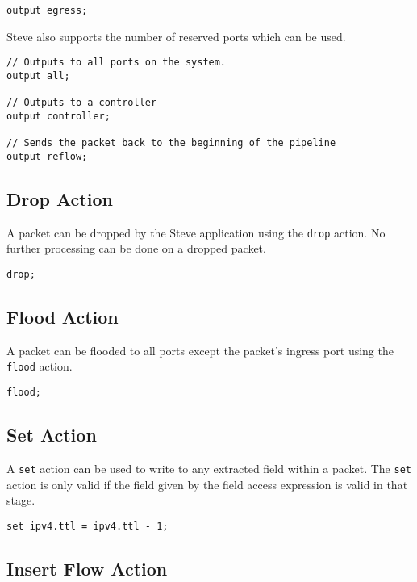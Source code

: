 \begin{lstlisting}
output egress;
\end{lstlisting}

Steve also supports the number of reserved ports which can be used.

\begin{lstlisting}
// Outputs to all ports on the system.
output all; 

// Outputs to a controller
output controller; 

// Sends the packet back to the beginning of the pipeline
output reflow; 
\end{lstlisting}

\subsection{Drop Action} \label{drop_action_tut}

A packet can be dropped by the Steve application using the \texttt{drop} action. No further processing can be done on a dropped packet.

\begin{lstlisting}
drop;
\end{lstlisting}

\subsection{Flood Action} \label{flood_action_tut}

A packet can be flooded to all ports except the packet's ingress port using the \texttt{flood} action.

\begin{lstlisting}
flood;
\end{lstlisting}

\subsection{Set Action} \label{set_action_tut}

A \texttt{set} action can be used to write to any extracted field within a packet. The \texttt{set} action is only valid if the field given by the field access expression is valid in that stage.

\begin{lstlisting}
set ipv4.ttl = ipv4.ttl - 1;
\end{lstlisting}

\subsection{Insert Flow Action} \label{insert_flow_action_tut}

